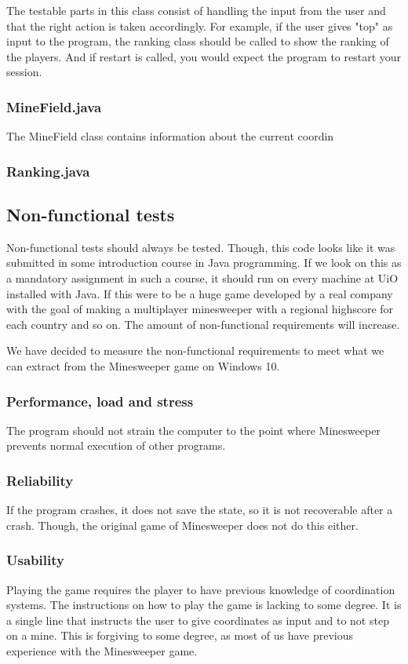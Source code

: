 \documentclass[UKenglish]{article}  %
\begin{document}
The testable parts in this class consist of handling the input from the user and
that the right action is taken accordingly. For example, if the user gives "top"
as input to the program, the ranking class should be called to show the ranking
of the players. And if restart is called, you would expect the program to
restart your session.

\subsubsection{MineField.java}
The MineField class contains information about the current coordin

\subsubsection{Ranking.java}

\subsection{Non-functional tests}
Non-functional tests should always be tested. Though, this code looks like it
was submitted in some introduction course in Java programming. If we look on
this as a mandatory assignment in such a course, it should run on every machine
at UiO installed with Java. If this were to be a huge game developed by a real
company with the goal of making a multiplayer minesweeper with a regional
highscore for each country and so on. The amount of non-functional requirements
will increase. 

We have decided to measure the non-functional requirements to meet what we can
extract from the Minesweeper game on Windows 10.

\subsubsection{Performance, load and stress}
The program should not strain the computer to the point where Minesweeper
prevents normal execution of other programs. 

\subsubsection{Reliability}
If the program crashes, it does not save the state, so it is not recoverable
after a crash. Though, the original game of Minesweeper does not do this either.

\subsubsection{Usability}
Playing the game requires the player to have previous knowledge of coordination
systems. The instructions on how to play the game is lacking to some degree. It
is a single line that instructs the user to give coordinates as input and to not
step on a mine. This is forgiving to some degree, as most of us have previous
experience with the Minesweeper game.
\end{document}
